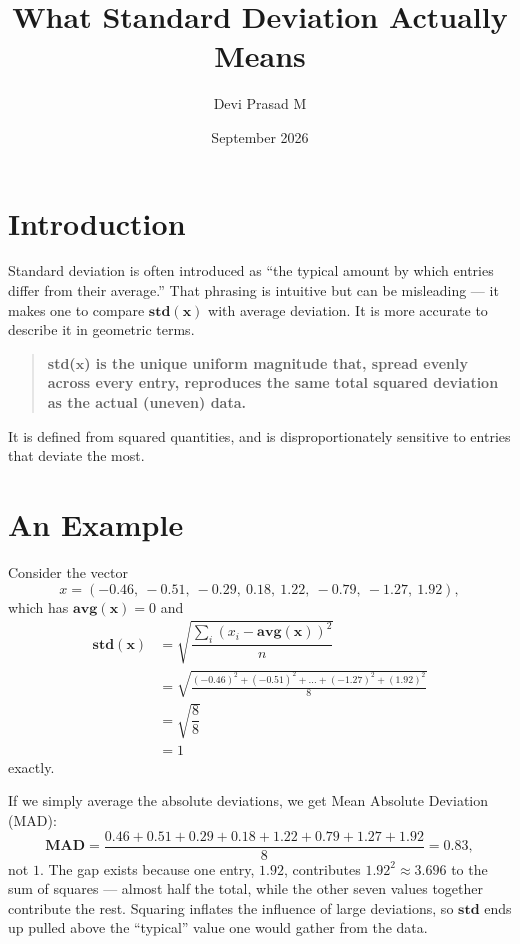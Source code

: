 \documentclass[12pt]{article}
\title{What Standard Deviation Actually Means}
\author{Devi Prasad M}
\date{September 2026}
\newcommand{\MVec}[1]{\mathbf{#1}}
\begin{document}
\pagecolor{yellow!30!brown!40}

\maketitle

\section*{Introduction}

Standard deviation is often introduced as ``the typical amount by
which entries differ from their average.'' That phrasing is
intuitive but can be misleading --- it makes one to compare
$\mathbf{std}(\MVec{x})$ with average deviation. It is more
accurate to describe it in geometric terms.

\begin{quote}
\textbf{std($\MVec{x}$) is the unique uniform magnitude that,
spread evenly across every entry, reproduces the same total
squared deviation as the actual (uneven) data.}
\end{quote}

It is defined from squared quantities, and is disproportionately
sensitive to entries that deviate the most.

\section*{An Example}

Consider the vector
\[
    x = (-0.46,\ -0.51,\ -0.29,\ 0.18,\ 1.22,\ -0.79,\ -1.27,\ 1.92),
\]
which has $\mathbf{avg}(\MVec{x}) = 0$ and
\begin{align*}
    \mathbf{std}(\MVec{x}) &= \sqrt{\dfrac{\sum_i (x_i - \mathbf{avg}(\MVec{x}))^2}{n}}\\[2pt]
                           &= \sqrt{\frac{(-0.46)^2 + (-0.51)^2 + \dots + (-1.27)^2 + (1.92)^2}{8}}\\[2pt]
                           &= \sqrt{\dfrac{8}{8}}\\
                           & = 1
\end{align*}
exactly.

\vspace*{1em}
\noindent If we simply average the absolute
deviations, we get Mean Absolute Deviation (MAD):
\[
    \mathbf{MAD} = \dfrac{0.46+0.51+0.29+0.18+1.22+0.79+1.27+1.92}{8} = 0.83,
\]
not $1$. The gap exists because one entry, $1.92$,
contributes $1.92^2 \approx 3.696$ to the sum of squares ---
almost half the total, while the other seven values together
contribute the rest. Squaring inflates the influence of large
deviations, so $\mathbf{std}$ ends up pulled above the
``typical'' value one would gather from the data.
\end{document}
